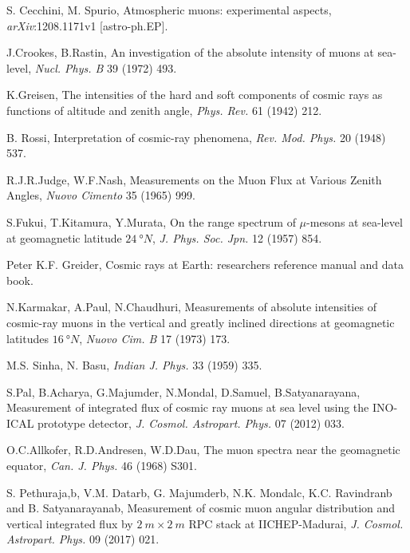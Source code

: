 \begin{thebibliography}{99} %

S. Cecchini, M. Spurio, Atmospheric muons: experimental aspects,
{\em arXiv}:1208.1171v1 [astro-ph.EP].

J.Crookes, B.Rastin, An investigation of the absolute intensity of muons at sea-level, 
{\em Nucl. Phys. B} 39 (1972) 493.

K.Greisen, The intensities of the hard and soft components of cosmic rays as functions of altitude and
zenith angle,
{\em Phys. Rev.} 61 (1942) 212.

B. Rossi, Interpretation of cosmic-ray phenomena,
{\em Rev. Mod. Phys.} 20 (1948) 537.

R.J.R.Judge, W.F.Nash, Measurements on the Muon Flux at Various Zenith Angles,
{\em Nuovo Cimento} 35 (1965) 999.

S.Fukui, T.Kitamura, Y.Murata, On the range spectrum of $\mu$-mesons at sea-level at geomagnetic latitude $\SI{24}{\degree N}$,
{\em J. Phys. Soc. Jpn.} 12 (1957) 854.

Peter K.F. Greider, Cosmic rays at Earth: researchers reference manual and data book.

N.Karmakar, A.Paul, N.Chaudhuri, Measurements of absolute intensities of cosmic-ray muons
in the vertical and greatly inclined directions at geomagnetic latitudes $\SI{16}{\degree N}$, 
{\em Nuovo Cim. B} 17 (1973) 173.

M.S. Sinha, N. Basu,
{\em Indian J. Phys.} 33 (1959) 335.

S.Pal, B.Acharya, G.Majumder, N.Mondal, D.Samuel, B.Satyanarayana, Measurement of integrated flux of cosmic ray muons at sea level using the INO-ICAL prototype detector,
{\em J. Cosmol. Astropart. Phys.} 07 (2012) 033.

O.C.Allkofer, R.D.Andresen, W.D.Dau, The muon spectra near the geomagnetic equator,
{\em Can. J. Phys.} 46 (1968) S301.

S. Pethuraja,b, V.M. Datarb, G. Majumderb, N.K. Mondalc, K.C. Ravindranb and B. Satyanarayanab, 
Measurement of cosmic muon angular distribution and vertical integrated flux by $\SI{2}{m} \times \SI{2}{m}$ RPC stack at IICHEP-Madurai, 
{\em J. Cosmol. Astropart. Phys.} 09 (2017) 021. 

\end{thebibliography}
